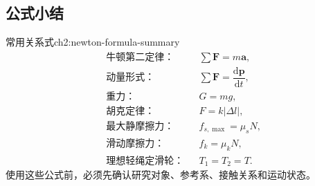\subsection{公式小结}

\begin{knowledge}{常用关系式}{ch2:newton-formula-summary}
\[
\begin{aligned}
&\text{牛顿第二定律：} && \sum \boldsymbol F=m\boldsymbol a,\\
&\text{动量形式：} && \sum \boldsymbol F=\dfrac{\mathrm d\boldsymbol p}{\mathrm dt},\\
&\text{重力：} && G=mg,\\
&\text{胡克定律：} && F=k|\Delta l|,\\
&\text{最大静摩擦力：} && f_{s,\max}=\mu_sN,\\
&\text{滑动摩擦力：} && f_k=\mu_kN,\\
&\text{理想轻绳定滑轮：} && T_1=T_2=T.
\end{aligned}
\]
使用这些公式前，必须先确认研究对象、参考系、接触关系和运动状态。
\end{knowledge}
